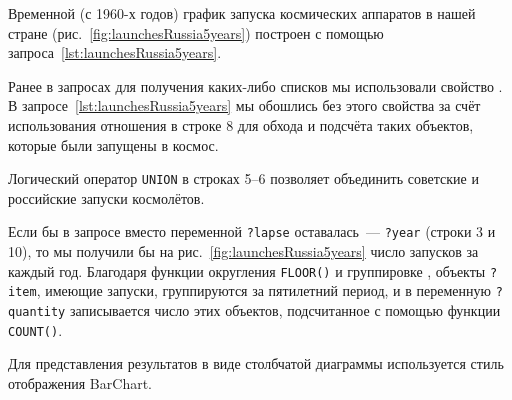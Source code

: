 Временной (с 1960-х годов) 
график запуска космических аппаратов в нашей стране (рис.~\ref{fig:launchesRussia5years}) 
построен с помощью запроса~\ref{lst:launchesRussia5years}.%

Ранее в запросах для получения каких-либо списков мы использовали свойство . 
В запросе~\ref{lst:launchesRussia5years} мы обошлись без этого свойства за счёт использования отношения 
 в строке 8 
для обхода и подсчёта таких объектов, которые были запущены в космос.  

Логический оператор \lstinline|UNION| в строках 5--6 
позволяет объединить советские и российские запуски космолётов. 

Если бы в запросе вместо переменной \lstinline|?lapse| оставалась~--- \lstinline|?year| (строки 3 и 10), 
то мы получили бы на рис.~\ref{fig:launchesRussia5years} 
число запусков за каждый год. 
Благодаря функции округления \lstinline|FLOOR()| 
и группировке%
, 
объекты \lstinline|?item|, имеющие запуски, группируются за пятилетний период, 
и в переменную \lstinline|?quantity| записывается число этих объектов, 
подсчитанное с помощью функции \lstinline|COUNT()|.

Для представления результатов в виде столбчатой диаграммы используется стиль отображения BarChart.

